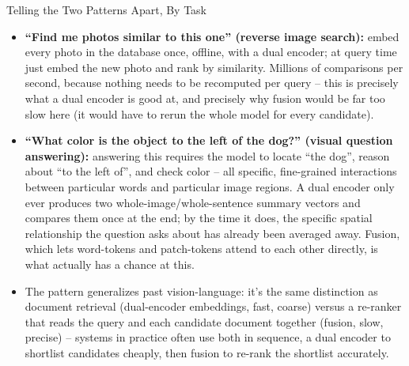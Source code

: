 \begin{vbframe}{Telling the Two Patterns Apart, By Task}
\begin{itemize}
  \item \textbf{``Find me photos similar to this one'' (reverse image search):} embed every photo in the database once, offline, with a dual encoder; at query time just embed the new photo and rank by similarity. Millions of comparisons per second, because nothing needs to be recomputed per query -- this is precisely what a dual encoder is good at, and precisely why fusion would be far too slow here (it would have to rerun the whole model for every candidate).
  \item \textbf{``What color is the object to the left of the dog?'' (visual question answering):} answering this requires the model to locate ``the dog'', reason about ``to the left of'', and check color -- all specific, fine-grained interactions between particular words and particular image regions. A dual encoder only ever produces two whole-image/whole-sentence summary vectors and compares them once at the end; by the time it does, the specific spatial relationship the question asks about has already been averaged away. Fusion, which lets word-tokens and patch-tokens attend to each other directly, is what actually has a chance at this.
  \item The pattern generalizes past vision-language: it's the same distinction as document retrieval (dual-encoder embeddings, fast, coarse) versus a re-ranker that reads the query and each candidate document together (fusion, slow, precise) -- systems in practice often use both in sequence, a dual encoder to shortlist candidates cheaply, then fusion to re-rank the shortlist accurately.
\end{itemize}
\end{vbframe}

